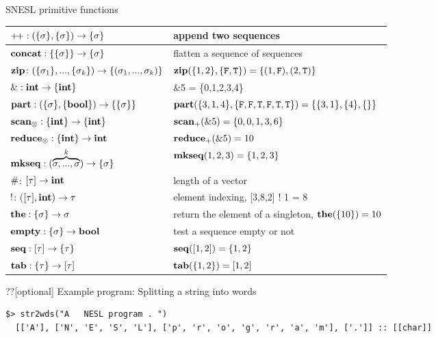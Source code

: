 \documentclass{beamer}
\begin{document}
\begin{frame}[fragile]{SNESL primitive functions}
	\begin{table}\footnotesize 
		\begin{tabular}{p{}|p{}}
			\hline
			$\*{{\++} : (\{\sgm\}, \{\sgm\}) \ra \{\sgm\}}$ & append two sequences \\ \hline
			$\mathbf{concat: \{\{\sigma\}\} \rightarrow \{\sigma\} }$ &  flatten a sequence of sequences                 \\ \hline
			$\mathbf{zip} \colon (\{\sigma_1\}, ..., \{\sigma_k\})\rightarrow \{(\sigma_1,...,\sigma_k)\}$ & $\mathbf{zip}(\{1,2\},\{\mathtt{F},\mathtt{T}\}) = \{(1,\mathtt{F}),(2,\mathtt{T})\}$\\ \hline
			$\mathbf{\&: \mathbf{int} \rightarrow \{\mathbf{int}\}}$  &  \&5 = \{0,1,2,3,4\} \\ \hline
			$\mathbf{part: (\{\sigma\}, \{\mathbf{bool}\}) \rightarrow  \{\{\sigma\}\}}$   & $\mathbf{part}(\{3,1,4\}, \{\mathtt{F},\mathtt{F},\mathtt{T},\mathtt{F},\mathtt{T},\mathtt{T}\}) = \{\{3,1\},\{4\},\{\}\}$                \\ \hline
			$\mathbf{scan_\otimes}: \{\mathbf{int}\} \rightarrow \{\mathbf{int}\}$     & $\mathbf{scan_+}(\&5) = \{0,0,1,3,6\} $  \\ \hline
			$\mathbf{reduce_\otimes: \{\mathbf{int}\} \rightarrow \mathbf{int} }$     &  $\mathbf{reduce_+}(\&5) = 10$              \\ \hline
			$\mathbf{mkseq}: (\overbrace{\sigma,...,\sigma}^{k}) \rightarrow \{\sigma\}$  & $\mathbf{mkseq}(1,2,3) = \{1,2,3\}$ \\ \hline  
			$\*{\#}$: $[\tau] \rightarrow \mathbf{int}$ & length of a vector \\ \hline  
			$\*{!}$: ($[\tau], \mathbf{int}) \rightarrow \tau$  & element indexing, [3,8,2] ! 1 = 8 \\ \hline  
			$\mathbf{the:  \{\sigma\} \rightarrow \sigma}$     &  return the element of a singleton,  $\mathbf{the}(\{10\}) = 10$        \\ \hline
			$\mathbf{empty:  \{\sigma\} \rightarrow \mathbf{bool}}$       & test a sequence empty or not             \\ \hline  
			$\mathbf{seq}: [\tau] \rightarrow \{\tau\} $  & $\mathbf{seq}([1,2]) = \{1,2\}$ \\ \hline  
			$\mathbf{tab}: \{\tau\} \rightarrow [\tau] $  & $\mathbf{tab}(\{1,2\}) = [1,2]$\\ \hline  
		\end{tabular}
	\end{table}
	
\end{frame}

\begin{frame}[fragile]{??[optional] Example program: Splitting a string into words}

 
 
	
\begin{lstlisting}[style=nesl-style]
  $> str2wds("A   NESL program . ")
  [['A'], ['N', 'E', 'S', 'L'], ['p', 'r', 'o', 'g', 'r', 'a', 'm'], ['.']] :: [[char]]
\end{lstlisting}
\end{frame}
\end{document}
